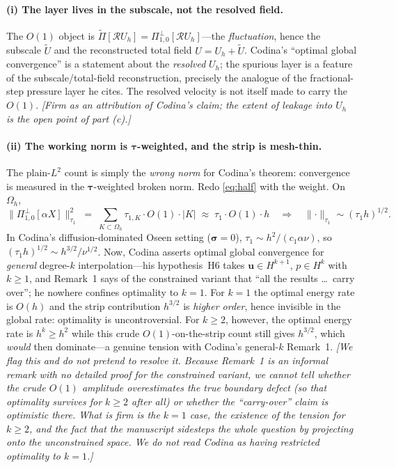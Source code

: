 \documentclass[11pt]{article}
\newcommand{\bu}{\boldsymbol{u}}
\newcommand{\bsig}{\boldsymbol{\sigma}}
\newcommand{\Rop}{\mathcal{R}}
\newcommand{\Ponez}{\Pi_{1,0}}
\newcommand{\Ptilde}{\widetilde{\Pi}}
\newcommand{\Uh}{U_{h}}
\newcommand{\Util}{\widetilde{U}}
\newcommand{\normtau}[1]{\lVert #1 \rVert_{\tau_{1}}}
\theoremstyle{plain}
\theoremstyle{definition}
\theoremstyle{remark}
\begin{document}
\paragraph{(i) The layer lives in the subscale, not the resolved field.}
The $O(1)$ object is $\Ptilde[\Rop U_h]=\Ponez^{\perp}[\Rop U_h]$---the
\emph{fluctuation}, hence the subscale $\Util$ and the reconstructed
total field $U=\Uh+\Util$. Codina's ``optimal global convergence'' is a
statement about the \emph{resolved} $\Uh$; the spurious layer is a
feature of the subscale/total-field reconstruction, precisely the
analogue of the fractional-step pressure layer he cites. The resolved
velocity is not itself made to carry the $O(1)$. \emph{[Firm as an
attribution of Codina's claim; the extent of leakage into $\Uh$ is the
open point of part (c).]}

\paragraph{(ii) The working norm is $\bm\tau$-weighted, and the strip is
mesh-thin.} The plain-$L^2$ count is simply the \emph{wrong norm} for
Codina's theorem: convergence is measured in the $\bm\tau$-weighted
broken norm. Redo \cref{eq:half} with the weight. On $\Omega_h$,
\begin{equation}\label{eq:weightcount}
  \normtau{\Ponez^{\perp}[\alpha X]}^2
  \;=\;\sum_{K\subset\Omega_h}\tau_{1,K}\cdot O(1)\cdot\lvert K\rvert
  \;\approx\;\tau_1\cdot O(1)\cdot h
  \quad\Longrightarrow\quad
  \normtau{\cdot}\sim(\tau_1 h)^{1/2}.
\end{equation}
In Codina's diffusion-dominated Oseen setting ($\bsig=0$),
$\tau_1\sim h^2/(c_1\alpha\nu)$, so $(\tau_1 h)^{1/2}\sim
h^{3/2}/\nu^{1/2}$. Now, Codina asserts optimal global convergence for
\emph{general} degree-$k$ interpolation---his hypothesis~H6 takes
$\bu\in H^{k+1}$, $p\in H^{k}$ with $k\ge1$, and Remark~1 says of the
constrained variant that ``all the results \dots\ carry over''; he
nowhere confines optimality to $k=1$. For $k=1$ the optimal energy rate
is $O(h)$ and the strip contribution $h^{3/2}$ is \emph{higher order},
hence invisible in the global rate: optimality is uncontroversial. For
$k\ge2$, however, the optimal energy rate is $h^{k}\ge h^2$ while this
crude $O(1)$-on-the-strip count still gives $h^{3/2}$, which \emph{would}
then dominate---a genuine tension with Codina's general-$k$ Remark~1.
\emph{[We flag this and do not pretend to resolve it. Because Remark~1 is
an informal remark with no detailed proof for the constrained variant,
we cannot tell whether the crude $O(1)$ amplitude overestimates the true
boundary defect (so that optimality survives for $k\ge2$ after all) or
whether the ``carry-over'' claim is optimistic there. What is firm is the
$k=1$ case, the existence of the tension for $k\ge2$, and the fact that
the manuscript sidesteps the whole question by projecting onto the
unconstrained space. We do \emph{not} read Codina as having restricted
optimality to $k=1$.]}
\end{document}
